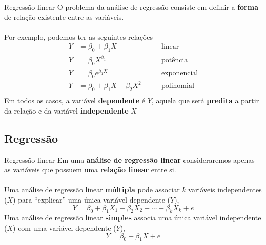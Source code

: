 \documentclass[10pt]{beamer}\usepackage[]{graphicx}\usepackage[]{color}
\theoremstyle{definition}
\begin{document}
\begin{frame}[fragile]{Regressão linear}
  O problema da análise de regressão consiste em definir a
  \textbf{forma} de relação existente entre as variáveis. \\~\\
  Por exemplo, podemos ter as seguintes relações
  \begin{align*}
    Y &= \beta_0 + \beta_1 X &\qquad \text{linear} \\
    Y &= \beta_0 X^{\beta_1} &\qquad \text{potência} \\
    Y &= \beta_0 e^{\beta_1 X} &\qquad \text{exponencial} \\
    Y &= \beta_0 + \beta_1 X + \beta_2 X^2 &\qquad \text{polinomial} \\
  \end{align*}
  Em todos os casos, a variável \textbf{dependente} é $Y$, aquela que
  será \textbf{predita} a partir da relação e da variável
  \textbf{independente} $X$
\end{frame}

\subsection{Regressão}

\begin{frame}[fragile]{Regressão linear}
  Em uma \textbf{análise de regressão linear} consideraremos apenas as
  variáveis que possuem uma \textbf{relação linear} entre si. \\~\\
  Uma análise de regressão linear \textbf{múltipla} pode associar $k$
  variáveis independentes ($X$) para ``explicar'' uma única variável
  dependente ($Y$),
  \begin{equation*}
    Y = \beta_0 + \beta_1 X_1 + \beta_2 X_2 + \cdots + \beta_k X_k + e
  \end{equation*}
  Uma análise de regressão linear \textbf{simples} associa uma única
  variável independente ($X$) com uma variável dependente ($Y$),
  \begin{equation*}
    Y = \beta_0 + \beta_1 X + e
  \end{equation*}
\end{frame}
\end{document}
